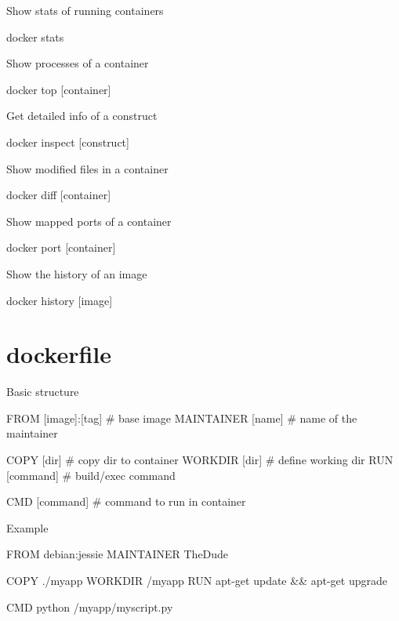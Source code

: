 \documentclass{refcard}
\begin{document}
Show stats of running containers
\begin{ttyenv}
docker stats
\end{ttyenv}

Show processes of a container
\begin{ttyenv}
docker top [container]
\end{ttyenv}

Get detailed info of a construct
\begin{ttyenv}
docker inspect [construct]
\end{ttyenv}

Show modified files in a container
\begin{ttyenv}
docker diff [container]
\end{ttyenv}

Show mapped ports of a container
\begin{ttyenv}
docker port [container]
\end{ttyenv}

Show the history of an image
\begin{ttyenv}
docker history [image]
\end{ttyenv}

\clearpage
\newpage


\section{dockerfile}

Basic structure
\begin{dockerbox}[title={Dockerfile example}]
FROM [image]:[tag]  # base image
MAINTAINER [name]   # name of the maintainer

COPY [dir]          # copy dir to container
WORKDIR [dir]       # define working dir
RUN [command]       # build/exec command

CMD [command]       # command to run in container
\end{dockerbox}

Example
\begin{dockerbox}[title={docker example}]
FROM debian:jessie  
MAINTAINER TheDude  

COPY ./myapp         
WORKDIR /myapp       
RUN apt-get update && apt-get upgrade

CMD python /myapp/myscript.py  
\end{dockerbox}

\rflicense
\end{document}
